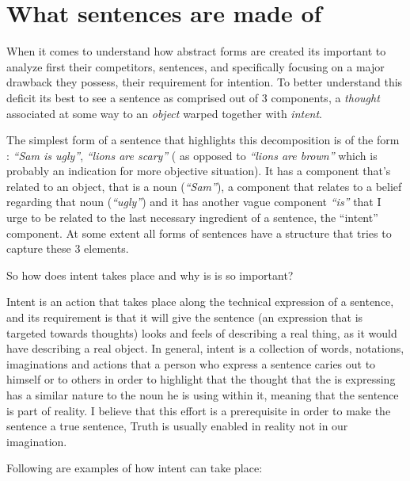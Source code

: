 \documentclass[10pt]{article}
\begin{document}
\newpage 
\section*{What sentences are made of}
When it comes to understand how abstract forms are created its important to analyze first their competitors, sentences, and specifically focusing on  a major drawback they possess, their requirement for intention. To better understand this deficit its best to see a sentence as comprised out of 3 components, a \textit{thought} associated at some way to an \textit{object} warped together with \textit{intent}.\par
The simplest form of a sentence that highlights this decomposition  is of the form : \textit{“Sam is ugly”}, \textit{“lions are scary”} ( as opposed to \textit{“lions are brown”} which is probably an indication for more objective situation). It has a component that’s  related to an object, that is a noun (\textit{“Sam”}), a component that relates to a belief regarding that noun (\textit{“ugly”}) and it has another vague component \textit{“is”} that I urge to be related to the last necessary ingredient of a sentence, the “intent” component. At some extent all forms of sentences  have a structure that tries to capture these 3 elements.
\par
So how does intent takes place and why is is so important?
\par
Intent is an action that takes place along the technical expression of a sentence, and its requirement is that it will give the sentence (an expression that is targeted towards thoughts) looks and feels of describing a real thing, as it would have describing a real object. In general, intent is a collection of words, notations, imaginations and actions that a person who express a sentence caries out to himself or to others in order to highlight that the thought that the  is expressing has a similar nature to the noun he is using within it, meaning that the sentence is part of reality.  I believe that this effort is a prerequisite in order to make the sentence a true sentence, Truth is usually enabled in reality not in our imagination.
\par
Following are examples of how intent can take place:\par
\end{document}

